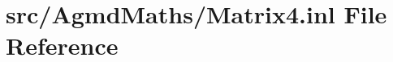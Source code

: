 \hypertarget{_matrix4_8inl}{\section{src/\+Agmd\+Maths/\+Matrix4.inl File Reference}
\label{_matrix4_8inl}
}
